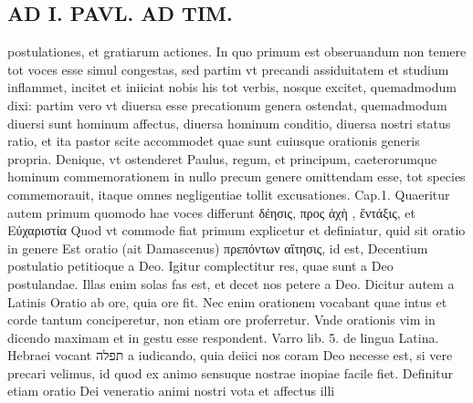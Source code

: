 \documentclass{article}
\begin{document}
\begin{pages}
\section*{AD I. PAVL. AD TIM. }
\marginpar{[ p.42 ]}\pstart postulationes, et gratiarum actiones. In quo primum est obseruandum non temere tot voces esse simul congestas, sed partim vt precandi assiduitatem et studium inflammet, incitet et iniiciat nobis his tot verbis, nosque excitet, quemadmodum dixi: partim vero vt diuersa esse precationum genera ostendat, quemadmodum diuersi sunt hominum affectus, diuersa hominum conditio, diuersa nostri status ratio, et ita pastor scite accommodet quae sunt cuiusque orationis generis propria. Denique, vt ostenderet Paulus, regum, et principum, caeterorumque hominum commemorationem in nullo precum genere omittendam esse, tot species commemorauit, itaque omnes negligentiae tollit excusationes. Cap.1. Quaeritur autem primum quomodo hae voces differunt δέησις, προς ἀχὴ  , ἔντάξις, et Εὐχαριστία Quod vt commode fiat primum explicetur et definiatur, quid sit oratio in genere Est oratio (ait Damascenus) πρεπόντων αἴτησις, id est, Decentium postulatio petitioque a Deo. Igitur complectitur res, quae sunt a Deo postulandae. Illas enim solas fas est, et decet nos petere a Deo. Dicitur autem a Latinis Oratio ab ore, quia ore fit. Nec enim orationem vocabant quae intus et corde tantum conciperetur, non etiam ore proferretur. Vnde orationis vim in dicendo maximam et in gestu esse respondent. Varro lib.  5. de lingua Latina. Hebraei vocant תפלה a iudicando, quia deiici nos coram Deo necesse est, si vere precari velimus, id quod ex animo sensuque nostrae inopiae facile fiet. Definitur etiam oratio Dei veneratio animi nostri vota et affectus illi  \pend

\end{pages}
\end{document}
